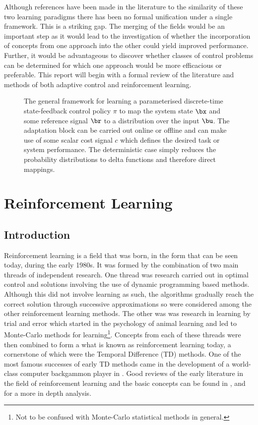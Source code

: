 Although references have been made in the literature to the similarity of these two learning paradigms there has been no formal unification under a single framework. This is a striking gap. The merging of the fields would be an important step as it would lead to the investigation of whether the incorporation of concepts from one approach into the other could yield improved performance. Further, it would be advantageous to discover whether classes of control problems can be determined for which one approach would be more efficacious or preferable. This report will begin with a formal review of the literature and methods of both adaptive control and reinforcement learning.

\begin{figure}
\centering

\caption{The general framework for learning a parameterised discrete-time state-feedback control policy $\pi$ to map the system state $\bx$ and some reference signal $\br$ to a distribution over the input $\bu$. The adaptation block can be carried out online or offline and can make use of some scalar cost signal $c$ which defines the desired task or system performance. The deterministic case simply reduces the probability distributions to delta functions and therefore direct mappings.}
\label{figs:learnframe}
\end{figure}


\section{Reinforcement Learning} %
\subsection{Introduction}
Reinforcement learning is a field that was born, in the form that can be seen today, during the early 1980s. It was formed by the combination of two main threads of independent research. One thread was research carried out in optimal control and solutions involving the use of dynamic programming based methods. Although this did not involve learning as such, the algorithms gradually reach the correct solution through successive approximations so were considered among the other reinforcement learning methods. The other was was research in learning by trial and error which started in the psychology of animal learning and led to Monte-Carlo methods for learning\footnote{Not to be confused with Monte-Carlo statistical methods in general.}. Concepts from each of these threads were then combined to form a what is known as reinforcement learning today, a cornerstone of which were the Temporal Difference (TD) methods. One of the most famous successes of early TD methods came in the development of a world-class computer backgammon player in \cite{Tes92,Tes95}. Good reviews of the early literature in the field of reinforcement learning and the basic concepts can be found in \cite{SuBa98}, \cite{KLM96} and \cite{BerTs96} for a more in depth analysis.


